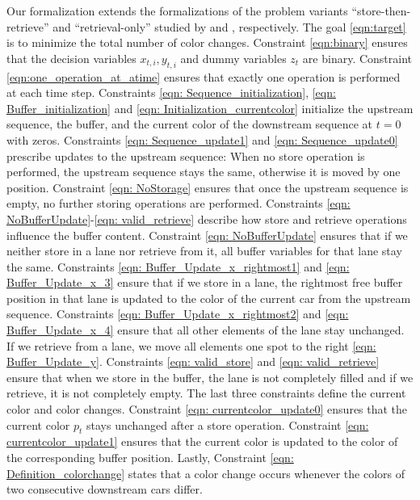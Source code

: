 \documentclass[11pt]{elsarticle}
\begin{document}
Our formalization extends the formalizations of the problem variants ``store-then-retrieve'' and ``retrieval-only'' studied by \citet{Ding.2004} and \citet{spieckermann_sequential_2004}, respectively.  
The goal \eqref{eqn:target} is to minimize the total number of color changes.
Constraint \eqref{eqn:binary} ensures that the decision variables $x_{t,i},y_{t,i}$ and dummy variables $z_t$ are binary.
Constraint \eqref{eqn:one_operation_at_atime} ensures that exactly one operation is performed at each time step. 
Constraints \eqref{eqn: Sequence_initialization}, \eqref{eqn: Buffer_initialization} and \eqref{eqn: Initialization_currentcolor} initialize the upstream sequence, the buffer, and the current color of the downstream sequence at $t=0$ with zeros. Constraints \eqref{eqn: Sequence_update1} and \eqref{eqn: Sequence_update0} prescribe updates to the upstream sequence: When no store operation is performed, the upstream sequence stays the same, otherwise it is moved by one position. Constraint \eqref{eqn: NoStorage} ensures that once the upstream sequence is empty, no further storing operations are performed. Constraints \eqref{eqn: NoBufferUpdate}-\eqref{eqn: valid_retrieve} describe how store and retrieve operations influence the buffer content. Constraint \eqref{eqn: NoBufferUpdate} ensures that if we neither store in a lane nor retrieve from it, all buffer variables for that lane stay the same. Constraints \eqref{eqn: Buffer_Update_x_rightmost1} and \eqref{eqn: Buffer_Update_x_3} ensure that if we store in a lane, the rightmost free buffer position in that lane is updated to the color of the current car from the upstream sequence. Constraints \eqref{eqn: Buffer_Update_x_rightmost2} and \eqref{eqn: Buffer_Update_x_4} ensure that all other elements of the lane stay unchanged. If we retrieve from a lane, we move all elements one spot to the right \eqref{eqn: Buffer_Update_y}. Constraints \eqref{eqn: valid_store} and \eqref{eqn: valid_retrieve} ensure that when we store in the buffer, the lane is not completely filled and if we retrieve, it is not completely empty. The last three constraints define the current color and color changes. 
Constraint \eqref{eqn: currentcolor_update0} ensures that the current color $p_t$ stays unchanged after a store operation. Constraint \eqref{eqn: currentcolor_update1} ensures that the current color is updated to the color of the corresponding buffer position. Lastly, Constraint \eqref{eqn: Definition_colorchange} states that a color change occurs whenever the colors of two consecutive downstream cars differ.
\end{document}
